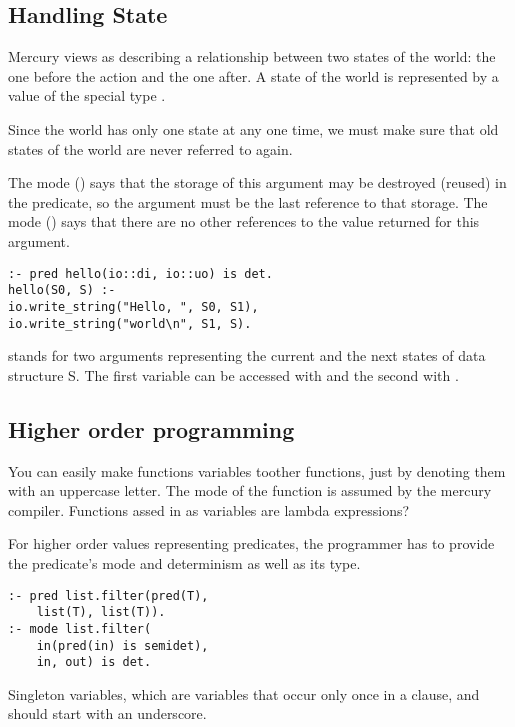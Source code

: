 \subsection{Handling State}
\begin{compactitem}
\item Mercury views  as describing a relationship between two states of the world: the one before the action and the one after. A state of the world is represented by a value of the special type .

\item Since the world has only one state at any one time, we must make sure that old states of the world are never referred to again.

\item The mode  () says that the storage of this argument may be destroyed (reused) in the predicate, so the argument must be the last reference to that storage. The mode  () says that there are no other references to the value returned for this argument.
\begin{lstlisting}
:- pred hello(io::di, io::uo) is det.
hello(S0, S) :-
io.write_string("Hello, ", S0, S1),
io.write_string("world\n", S1, S).
\end{lstlisting}

\item {} stands for two arguments representing the current and the next states of data structure S. The first variable can be accessed with  and the second with .

\subsection{Higher order programming}
\item You can easily make functions variables toother functions, just by denoting them with an uppercase letter. The mode of the function is assumed by the mercury compiler. Functions assed in as variables are lambda expressions?

\item For higher order values representing predicates, the programmer
has to provide the predicate’s mode and determinism as well as its type.
\begin{lstlisting}
:- pred list.filter(pred(T),
    list(T), list(T)).
:- mode list.filter(
    in(pred(in) is semidet),
    in, out) is det.
\end{lstlisting}
\item Singleton variables, which are variables that occur
only once in a clause, and should start with an underscore.


\end{compactitem}
